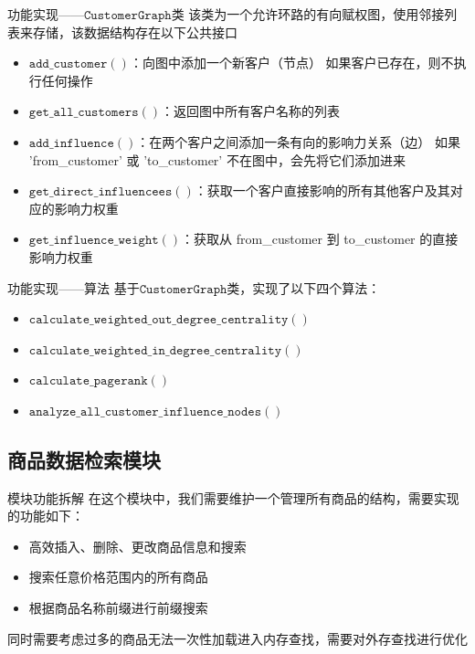\documentclass[aspectratio=169]{beamer}
\begin{document}
\begin{frame}{功能实现——$\mathtt{CustomerGraph}$类}
    该类为一个允许环路的有向赋权图，使用邻接列表来存储，该数据结构存在以下公共接口
    \begin{itemize}
    \item $\mathtt{add\_customer()}$：向图中添加一个新客户（节点） 如果客户已存在，则不执行任何操作
    \item $\mathtt{get\_all\_customers()}$：返回图中所有客户名称的列表
    \item $\mathtt{add\_influence()}$：在两个客户之间添加一条有向的影响力关系（边） 如果 'from\_customer' 或 'to\_customer' 不在图中，会先将它们添加进来
    \item $\mathtt{get\_direct\_influencees()}$：获取一个客户直接影响的所有其他客户及其对应的影响力权重
    \item $\mathtt{get\_influence\_weight()}$：获取从 from\_customer 到 to\_customer 的直接影响力权重 
\end{itemize}
\end{frame}

\begin{frame}{功能实现——算法}
    基于$\mathtt{CustomerGraph}$类，实现了以下四个算法：
\begin{itemize}
    \item $\mathtt{calculate\_weighted\_out\_degree\_centrality()}$
    \item $\mathtt{calculate\_weighted\_in\_degree\_centrality()}$
    \item $\mathtt{calculate\_pagerank()}$
    \item $\mathtt{analyze\_all\_customer\_influence\_nodes()}$
\end{itemize}
\end{frame}

\subsection{商品数据检索模块}
\begin{frame}{模块功能拆解}
    在这个模块中，我们需要维护一个管理所有商品的结构，需要实现的功能如下：
    \begin{itemize}
        \item 高效插入、删除、更改商品信息和搜索
        \item 搜索任意价格范围内的所有商品
        \item 根据商品名称前缀进行前缀搜索
    \end{itemize}
    同时需要考虑过多的商品无法一次性加载进入内存查找，需要对外存查找进行优化
\end{frame}
\end{document}
